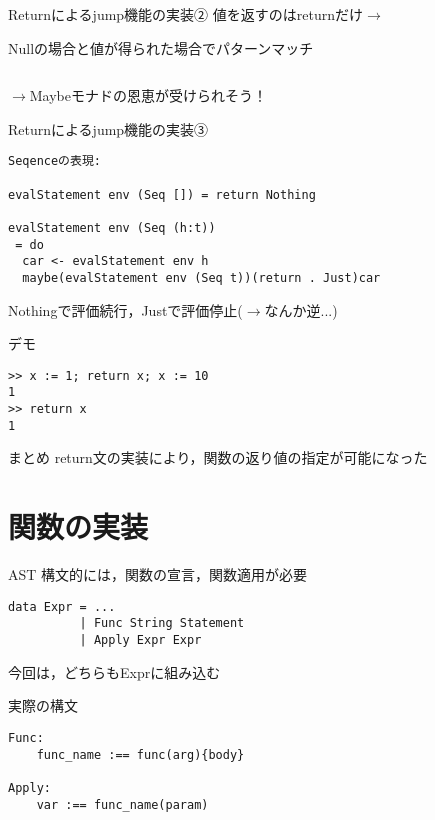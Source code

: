 \documentclass[uplatex,dvipdfmx,ja=standard]{beamer}
\begin{document}
\begin{frame}[fragile]{Returnによるjump機能の実装②}
値を返すのはreturnだけ$\to$

Nullの場合と値が得られた場合でパターンマッチ
\begin{verbatim}

\end{verbatim}

$\to$Maybeモナドの恩恵が受けられそう！

\end{frame}

\begin{frame}[fragile]{Returnによるjump機能の実装③}
    \begin{verbatim}
Seqenceの表現:

evalStatement env (Seq []) = return Nothing   

evalStatement env (Seq (h:t)) 
 = do 
  car <- evalStatement env h
  maybe(evalStatement env (Seq t))(return . Just)car
    \end{verbatim}
    Nothingで評価続行，Justで評価停止($\to$なんか逆...)
\end{frame}


\begin{frame}[fragile]{デモ}
    \begin{verbatim}
>> x := 1; return x; x := 10
1
>> return x
1
    \end{verbatim}

\end{frame}

\begin{frame}{まとめ}
return文の実装により，関数の返り値の指定が可能になった
\end{frame}


\section{関数の実装}

\begin{frame}[fragile]{AST}
    構文的には，関数の宣言，関数適用が必要

    \begin{verbatim}
data Expr = ...
          | Func String Statement
          | Apply Expr Expr     
    \end{verbatim}
今回は，どちらもExprに組み込む
\end{frame}


\begin{frame}[fragile]{実際の構文}
    \begin{verbatim}
Func:
    func_name :== func(arg){body}

Apply:
    var :== func_name(param) 
\end{verbatim}

\end{frame}
\end{document}
